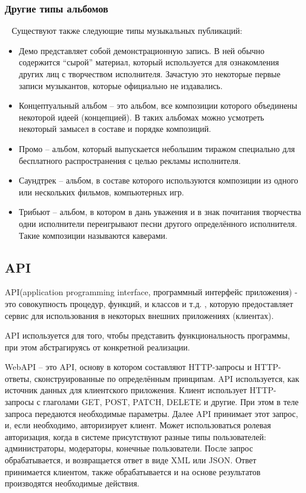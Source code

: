 \subsubsection{Другие типы альбомов}
\label{sub:domain:music_album:other_types_classification}
~\newline
\indent Существуют также следующие типы музыкальных публикаций:
\begin{itemize}
  \item Демо представляет собой демонстрационную запись. В ней обычно содержится “сырой” материал, который используется для ознакомления других лиц с творчеством исполнителя. Зачастую это некоторые первые записи музыкантов, которые официально не издавались.
  \item Концептуальный альбом -- это альбом, все композиции которого объединены некоторой идеей (концепцией). В таких альбомах можно усмотреть некоторый замысел в составе и порядке композиций.
  \item Промо -- альбом, который выпускается небольшим тиражом специально для бесплатного распространения с целью рекламы исполнителя.
  \item Саундтрек -- альбом, в составе которого используются композиции из одного или нескольких фильмов, компьютерных игр.
  \item Трибьют -- альбом, в котором в дань уважения и в знак почитания творчества одни исполнители переигрывают песни другого определённого исполнителя. Такие композиции называются каверами.
\end{itemize}

\subsection{API}
\label{sub:domain:api}
API(application programming interface, программный интерфейс приложения) - это совокупность процедур, функций, и классов и т.д. , которую предоставляет сервис для использования в некоторых внешних приложениях (клиентах).

API используется для того, чтобы представить функциональность программы, при этом абстрагируясь от конкретной реализации.

WebAPI -- это API, основу в котором составляют HTTP-запросы и HTTP-ответы, сконструированные по определённым принципам. API используется, как источник данных для клиентского приложения. Клиент использует HTTP-запросы с глаголами GET, POST, PATCH, DELETE и другие. При этом в теле запроса передаются необходимые параметры. Далее API принимает этот запрос, и, если необходимо, авторизирует клиент. Может использоваться ролевая авторизация, когда в системе присутствуют разные типы пользователей: администраторы, модераторы, конечные пользователи. После запрос обрабатывается, и возвращается ответ в виде XML или JSON. Ответ принимается клиентом, также обрабатывается и на основе результатов производятся необходимые действия.
